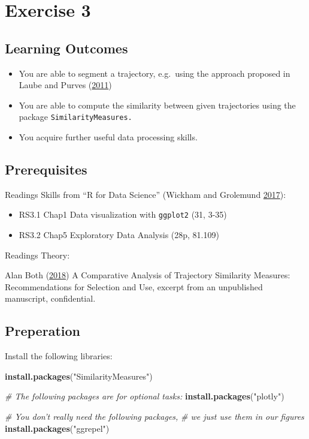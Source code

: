 \documentclass[]{book}
\newenvironment{Shaded}{\begin{snugshade}}{\end{snugshade}}
\newcommand{\KeywordTok}[1]{\textcolor[rgb]{0.13,0.29,0.53}{\textbf{#1}}}
\newcommand{\StringTok}[1]{\textcolor[rgb]{0.31,0.60,0.02}{#1}}
\newcommand{\CommentTok}[1]{\textcolor[rgb]{0.56,0.35,0.01}{\textit{#1}}}
\newcommand{\NormalTok}[1]{#1}
\providecommand{\tightlist}{%
  \setlength{\itemsep}{0pt}\setlength{\parskip}{0pt}}
\begin{document}
\chapter{Exercise 3}\label{exercise-3}

\section{Learning Outcomes}\label{learning-outcomes-1}

\begin{itemize}
\tightlist
\item
  You are able to segment a trajectory, e.g.~using the approach proposed
  in Laube and Purves (\protect\hyperlink{ref-laube2011}{2011})
\item
  You are able to compute the similarity between given trajectories
  using the package \texttt{SimilarityMeasures.}
\item
  You acquire further useful data processing skills.
\end{itemize}

\section{Prerequisites}\label{prerequisites-2}

Readings Skills from ``R for Data Science'' (Wickham and Grolemund
\protect\hyperlink{ref-wickham2017}{2017}):

\begin{itemize}
\tightlist
\item
  RS3.1 Chap1 Data visualization with \texttt{ggplot2} (31, 3-35)
\item
  RS3.2 Chap5 Exploratory Data Analysis (28p, 81.109)
\end{itemize}

Readings Theory:

Alan Both (\protect\hyperlink{ref-both2018}{2018}) A Comparative
Analysis of Trajectory Similarity Measures: Recommendations for
Selection and Use, excerpt from an unpublished manuscript, confidential.

\section{Preperation}\label{preperation-4}

Install the following libraries:

\begin{Shaded}
\begin{Highlighting}[]
\KeywordTok{install.packages}\NormalTok{(}\StringTok{"SimilarityMeasures"}\NormalTok{)}

\CommentTok{# The following packages are for optional tasks:}
\KeywordTok{install.packages}\NormalTok{(}\StringTok{"plotly"}\NormalTok{)}

\CommentTok{# You don't really need the following packages, }
\CommentTok{# we just use them in our figures}
\KeywordTok{install.packages}\NormalTok{(}\StringTok{"ggrepel"}\NormalTok{)}
\end{Highlighting}
\end{Shaded}
\end{document}
